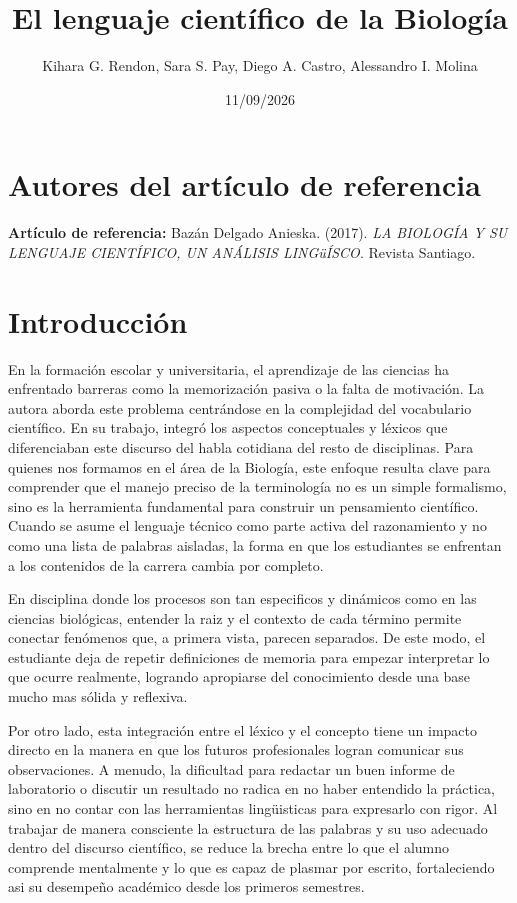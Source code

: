 \documentclass[12pt]{article}
\title{El lenguaje científico de la Biología}
\author{Kihara G. Rendon, Sara S. Pay, Diego A. Castro, Alessandro I. Molina}
\date{11/09/2026}
\begin{document}
\maketitle
\section{Autores del artículo de referencia}
\textbf{Artículo de referencia:} Bazán Delgado Anieska. (2017). \textit{LA BIOLOGÍA Y SU LENGUAJE CIENTÍFICO, UN ANÁLISIS LINGüÍSCO}. Revista Santiago.

\section{Introducción}
En la formación escolar y universitaria, el aprendizaje de las ciencias ha enfrentado barreras como la memorización pasiva o la falta de motivación. La autora aborda este problema centrándose en la complejidad del vocabulario científico. En su trabajo, integró los aspectos conceptuales y léxicos que diferenciaban este discurso del habla cotidiana del resto de disciplinas. Para quienes nos formamos en el área de la Biología, este enfoque resulta clave para comprender que el manejo preciso de la terminología no es un simple formalismo, sino es la herramienta fundamental para construir un pensamiento científico. Cuando se asume el lenguaje técnico como parte activa del razonamiento y no como una lista de palabras aisladas, la forma en que los estudiantes se enfrentan a los contenidos de la carrera cambia por completo. 

En disciplina donde los procesos son tan especificos y dinámicos como en las ciencias biológicas, entender la raiz y el contexto de cada término permite conectar fenómenos que, a primera vista, parecen separados. De este modo, el estudiante deja de repetir definiciones de memoria para empezar interpretar lo que ocurre realmente, logrando apropiarse del conocimiento desde una base mucho mas sólida y reflexiva.

Por otro lado, esta integración entre el léxico y el concepto tiene un impacto directo en la manera en que los futuros profesionales logran comunicar sus observaciones. A menudo, la dificultad para redactar un buen informe de laboratorio o discutir un resultado no radica en no haber entendido la práctica, sino en no contar con las herramientas lingüisticas para expresarlo con rigor. Al trabajar de manera consciente la estructura de las palabras y su uso adecuado dentro del discurso científico, se reduce la brecha entre lo que el alumno comprende mentalmente y lo que es capaz de plasmar por escrito, fortaleciendo asi su desempeño académico desde los primeros semestres.
\end{document}
